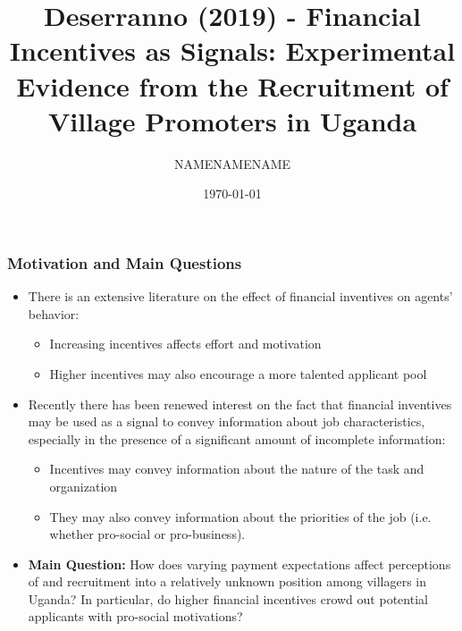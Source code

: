 \documentclass{beamer}
\title[Week 12]{Deserranno (2019) - Financial Incentives as Signals: Experimental Evidence from the Recruitment of Village Promoters in Uganda} %
\author{NAMENAMENAME} %
\institute[Columbia] %
{
Columbia University \\ %
{Public Economics and Development - ECOGR6307} \\
\medskip
\textit{bcv2107@columbia.edu} \\
}
\date{\today} %
\begin{document}
\begin{frame}
\titlepage %
\end{frame}








\begin{frame}
\frametitle{Motivation and Main Questions}
\small{
 

 \begin{itemize}
\item There is an extensive literature on the effect of financial inventives on agents' behavior:\medskip
\begin{itemize}
\item Increasing incentives affects effort and motivation\medskip
\item Higher incentives may also encourage a more talented applicant pool\medskip
\end{itemize}
\item Recently there has been renewed interest on the fact that financial inventives may be used as a signal to convey information about job characteristics, especially in the presence of a significant amount of incomplete information: \medskip
\begin{itemize}
\item Incentives may convey information about the nature of the task and organization\medskip
\item They may also convey information about the priorities of the job (i.e. whether pro-social or pro-business). \medskip
\end{itemize}
\item \textbf{Main Question:} How does varying payment expectations affect perceptions of and recruitment into a relatively unknown position among villagers in Uganda? In particular, do higher financial incentives crowd out potential applicants with pro-social motivations? \medskip


\end{itemize}

}
\end{frame}
\end{document}
